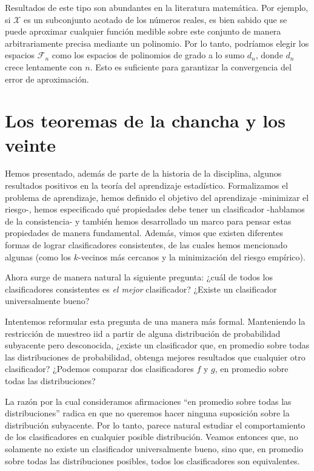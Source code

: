\documentclass{report}
\begin{document}
Resultados de este tipo son abundantes en la literatura matemática. Por ejemplo, si \(\mathcal{X}\) es un subconjunto 
acotado de los números reales, es bien sabido que se puede aproximar cualquier función medible sobre este 
conjunto de manera arbitrariamente precisa mediante un polinomio. Por lo tanto, podríamos elegir los espacios 
\(\mathcal{F}_n\) como los espacios de polinomios de grado a lo sumo \(d_n\), donde \(d_n\) crece lentamente 
con \(n\). Esto es suficiente para garantizar la convergencia del error de aproximación.\newline

\section{Los teoremas de la chancha y los veinte}

Hemos presentado, además de parte de la historia de la disciplina, algunos resultados positivos en la teoría del aprendizaje estadístico. 
Formalizamos el problema de aprendizaje, hemos definido el objetivo del aprendizaje -minimizar el 
riesgo-, hemos especificado qué propiedades debe tener un clasificador -hablamos de la consistencia- y también hemos desarrollado un 
marco para pensar estas propiedades de manera fundamental. Además, vimos que existen 
diferentes formas de lograr clasificadores consistentes, de las cuales hemos mencionado algunas (como los \(k\)-vecinos más cercanos y la 
minimización del riesgo empírico).\newline

Ahora surge de manera natural la siguiente pregunta: ¿cuál de todos los clasificadores consistentes 
es \textit{el mejor} clasificador? ¿Existe un clasificador universalmente bueno?\newline

Intentemos reformular esta pregunta de una manera más formal. Manteniendo la restricción de muestreo iid
a partir de alguna distribución de probabilidad subyacente pero desconocida, ¿existe 
un clasificador que, en promedio sobre todas las distribuciones de probabilidad, obtenga mejores 
resultados que cualquier otro clasificador? ¿Podemos comparar dos clasificadores \(f\) y \(g\), 
en promedio sobre todas las distribuciones?\newline

La razón por la cual consideramos afirmaciones ``en promedio sobre todas las distribuciones'' radica 
en que no queremos hacer ninguna suposición sobre la distribución subyacente. Por lo tanto, parece 
natural estudiar el comportamiento de los clasificadores en cualquier posible distribución. Veamos entonces
que, no solamente no existe un clasificador universalmente bueno, sino que, en promedio sobre todas las distribuciones
posibles, todos los clasificadores son equivalentes.\newline
\end{document}
